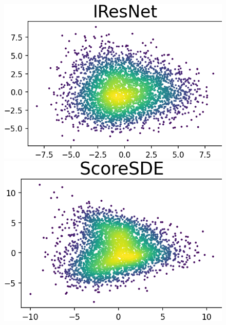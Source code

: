 \documentclass{article}
\theoremstyle{remark}
\theoremstyle{plain}
\begin{document}
{\begin{figure}[!t]
\begin{minipage}{0.155\textwidth}
    \end{minipage}
    \begin{minipage}{0.16\textwidth}
        \vspace{-0.2in}\includegraphics[width=\linewidth]{MINIBOONE_PCA_2D_compare_IResNet.png}
    \end{minipage}
    \begin{minipage}{0.155\textwidth}
        \vspace{-0.2in}\includegraphics[width=\linewidth]{MINIBOONE_PCA_2D_compare_ScoreSDE.png}
    \end{minipage}
    

\end{figure}}
\end{document}

